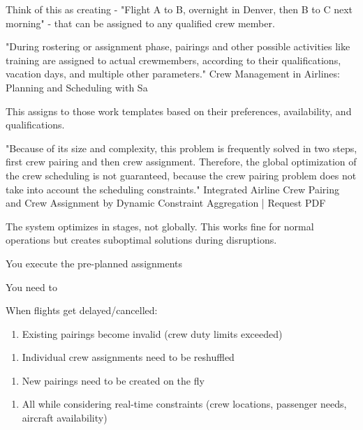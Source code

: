 Think of this as creating 
 - "Flight A to B, overnight in Denver, then B to C next morning" - that can be assigned to any qualified crew member.

"During rostering or assignment phase, pairings and other possible activities like training are assigned to actual crewmembers, according to their qualifications, vacation days, and multiple other parameters." 
Crew Management in Airlines: Planning and Scheduling with Sa

This assigns 
 to those work templates based on their preferences, availability, and qualifications.

"Because of its size and complexity, this problem is frequently solved in two steps, first crew pairing and then crew assignment. Therefore, the global optimization of the crew scheduling is not guaranteed, because the crew pairing problem does not take into account the scheduling constraints." 
Integrated Airline Crew Pairing and Crew Assignment by Dynamic Constraint Aggregation | Request PDF

 The system optimizes in stages, not globally. This works fine for normal operations but creates suboptimal solutions during disruptions.

 You execute the pre-planned assignments

 You need to 

When flights get delayed/cancelled:

\begin{enumerate}
\item Existing pairings become invalid (crew duty limits exceeded)
\end{enumerate}
\begin{enumerate}
\item Individual crew assignments need to be reshuffled
\end{enumerate}
\begin{enumerate}
\item New pairings need to be created on the fly
\end{enumerate}
\begin{enumerate}
\item All while considering real-time constraints (crew locations, passenger needs, aircraft availability)
\end{enumerate}

